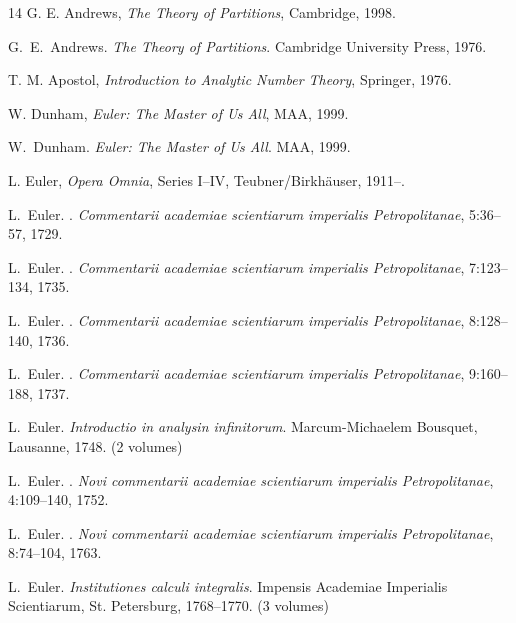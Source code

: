\documentclass[11pt,a4paper,twoside]{book}
\theoremstyle{eulerstyle}
\theoremstyle{definition}
\begin{document}
\begin{thebibliography}{14}
G. E. Andrews, \textit{The Theory of Partitions}, Cambridge, 1998.

G.~E.~Andrews.
\newblock \emph{The Theory of Partitions}.
\newblock Cambridge University Press, 1976.

T. M. Apostol, \textit{Introduction to Analytic Number Theory}, Springer, 1976.

W. Dunham, \textit{Euler: The Master of Us All}, MAA, 1999.

W.~Dunham.
\newblock \emph{Euler: The Master of Us All}.
\newblock MAA, 1999.

L. Euler, \textit{Opera Omnia}, Series I--IV, Teubner/Birkh\"auser, 1911--.

L.~Euler.
.
\newblock \emph{Commentarii academiae scientiarum imperialis Petropolitanae}, 5:36--57, 1729.

L.~Euler.
.
\newblock \emph{Commentarii academiae scientiarum imperialis Petropolitanae}, 7:123--134, 1735.

L.~Euler.
.
\newblock \emph{Commentarii academiae scientiarum imperialis Petropolitanae}, 8:128--140, 1736.

L.~Euler.
.
\newblock \emph{Commentarii academiae scientiarum imperialis Petropolitanae}, 9:160--188, 1737.

L.~Euler.
\newblock \emph{Introductio in analysin infinitorum}.
\newblock Marcum-Michaelem Bousquet, Lausanne, 1748. (2 volumes)

L.~Euler.
.
\newblock \emph{Novi commentarii academiae scientiarum imperialis Petropolitanae}, 4:109--140, 1752.

L.~Euler.
.
\newblock \emph{Novi commentarii academiae scientiarum imperialis Petropolitanae}, 8:74--104, 1763.

L.~Euler.
\newblock \emph{Institutiones calculi integralis}.
\newblock Impensis Academiae Imperialis Scientiarum, St. Petersburg, 1768--1770. (3 volumes)


\end{thebibliography}
\end{document}

